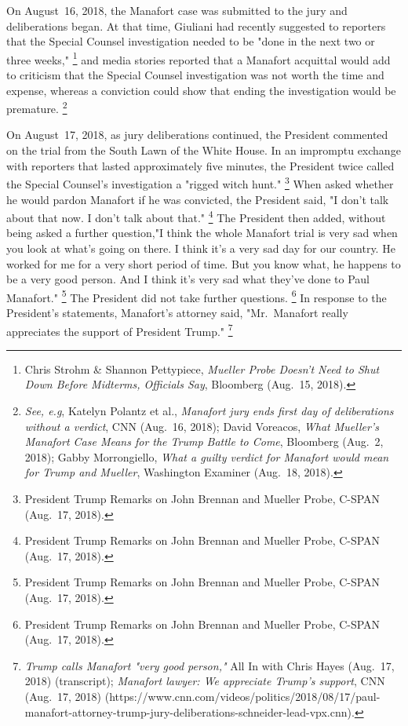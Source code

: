 On August~16, 2018, the Manafort case was submitted to the jury and deliberations began.
At that time, Giuliani had recently suggested to reporters that the Special Counsel investigation needed to be "done in the next two or three weeks,"%
\footnote{Chris Strohm \& Shannon Pettypiece, \textit{Mueller Probe Doesn't Need to Shut Down Before Midterms, Officials Say}, Bloomberg (Aug.~15, 2018).}
and media stories reported that a Manafort acquittal would add to criticism that the Special Counsel investigation was not worth the time and expense, whereas a conviction could show that ending the investigation would be premature.%
\footnote{\textit{See, e.g}, Katelyn Polantz et al., \textit{Manafort jury ends first day of deliberations without a verdict}, CNN (Aug.~16, 2018);
David Voreacos, \textit{What Mueller's Manafort Case Means for the Trump Battle to Come}, Bloomberg (Aug.~2, 2018);
Gabby Morrongiello, \textit{What a guilty verdict for Manafort would mean for Trump and Mueller}, Washington Examiner (Aug.~18, 2018).}

On August~17, 2018, as jury deliberations continued, the President commented on the trial from the South Lawn of the White House.
In an impromptu exchange with reporters that lasted approximately five minutes, the President twice called the Special Counsel's investigation a "rigged witch hunt."%
\footnote{President Trump Remarks on John Brennan and Mueller Probe, C-SPAN (Aug.~17, 2018).}
When asked whether he would pardon Manafort if he was convicted, the President said, "I don't talk about that now.
I don't talk about that."%
\footnote{President Trump Remarks on John Brennan and Mueller Probe, C-SPAN (Aug.~17, 2018).}
The President then added, without being asked a further question,"I think the whole Manafort trial is very sad when you look at what's going on there.
I think it's a very sad day for our country.
He worked for me for a very short period of time.
But you know what, he happens to be a very good person.
And I think it's very sad what they've done to Paul Manafort."%
\footnote{President Trump Remarks on John Brennan and Mueller Probe, C-SPAN (Aug.~17, 2018).}
The President did not take further questions.%
\footnote{President Trump Remarks on John Brennan and Mueller Probe, C-SPAN (Aug.~17, 2018).}
In response to the President's statements, Manafort's attorney said, "Mr.~Manafort really appreciates the support of President Trump."%
\footnote{\textit{Trump calls Manafort "very good person,"} All In with Chris Hayes (Aug.~17, 2018) (transcript);
\textit{Manafort lawyer: We appreciate Trump's support}, CNN (Aug.~17, 2018) (https://www.cnn.com/videos/politics/2018/08/17/paul-manafort-attorney-trump-jury-deliberations-schneider-lead-vpx.cnn).}

